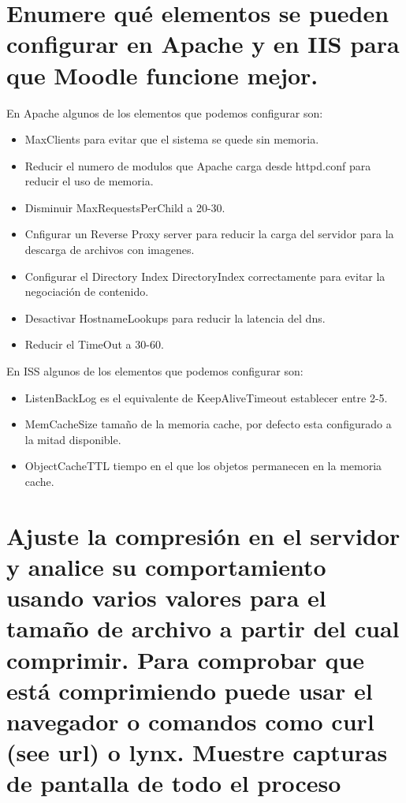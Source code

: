 \section[Cuestión 4]{ Enumere qué elementos se pueden configurar en Apache y en IIS para que Moodle funcione mejor.}

En Apache algunos de los elementos que podemos configurar son:

\begin{itemize}
	\item MaxClients para evitar que el sistema se quede sin memoria.
	\item Reducir el numero de modulos que Apache carga desde httpd.conf para reducir el uso de memoria.
	\item Disminuir MaxRequestsPerChild a 20-30.
	\item Cnfigurar un Reverse Proxy server para reducir la carga del servidor para la descarga de archivos con imagenes.
	\item Configurar el Directory Index DirectoryIndex correctamente para evitar la negociación de contenido.
	\item Desactivar HostnameLookups para reducir la latencia del dns.
	\item Reducir el TimeOut a 30-60.
	
\end{itemize}

En ISS algunos de los elementos que podemos configurar son:

\begin{itemize}
	\item ListenBackLog es el equivalente de KeepAliveTimeout establecer entre 2-5.
	\item MemCacheSize tamaño de la memoria cache, por defecto esta configurado a la mitad disponible.
	\item ObjectCacheTTL tiempo en el que los objetos permanecen en la memoria cache.
	
	
\end{itemize}

\section[Cuestión 5]{ Ajuste la compresión en el servidor y analice su comportamiento usando varios valores para el tamaño de archivo a partir del cual comprimir. Para comprobar que está comprimiendo puede usar el navegador o comandos como curl (see url) o lynx. Muestre capturas de pantalla de todo el proceso}


